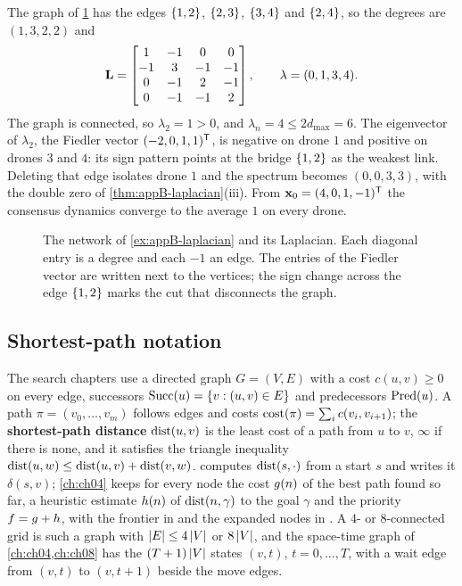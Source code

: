 \begin{example}
\label{ex:appB-laplacian}
The graph of \cref{fig:appB-laplacian} has the edges $\left\{ 1,2 \right\}$, $\left\{ 2,3 \right\}$, $\left\{ 3,4 \right\}$ and $\left\{ 2,4 \right\}$, so the degrees are $(1, 3, 2, 2)$ and
\begin{equation*}
  \mathbf{L} = \begin{bmatrix} 1 & -1 & 0 & 0\\ -1 & 3 & -1 & -1\\ 0 & -1 & 2 & -1\\ 0 & -1 & -1 & 2\end{bmatrix},
  \qquad \lambda = (0, 1, 3, 4).
\end{equation*}
The graph is connected, so $\lambda_2 = 1 > 0$, and $\lambda_n = 4 \le 2d_{\max} = 6$. The eigenvector of $\lambda_2$, the Fiedler vector $(-2, 0, 1, 1)^{\mathsf{T}}$, is negative on drone $1$ and positive on drones $3$ and $4$: its sign pattern points at the bridge $\left\{ 1,2 \right\}$ as the weakest link. Deleting that edge isolates drone $1$ and the spectrum becomes $(0, 0, 3, 3)$, with the double zero of \cref{thm:appB-laplacian}(iii). From $\mathbf{x}_0 = (4, 0, 1, -1)^{\mathsf{T}}$ the consensus dynamics converge to the average $1$ on every drone.
\end{example}

\begin{figure}[tb]
  \centering
  \caption{The network of \cref{ex:appB-laplacian} and its Laplacian. Each diagonal entry is a degree and each $-1$ an edge. The entries of the Fiedler vector are written next to the vertices; the sign change across the edge $\left\{ 1,2 \right\}$ marks the cut that disconnects the graph.}
  \label{fig:appB-laplacian}
\end{figure}

\subsection{Shortest-path notation}
\label{sec:appB-shortest-path}

The search chapters use a directed graph $G = (V, E)$ with a cost $c(u, v)
\ge 0$ on every edge, successors $\operatorname{Succ}(u) = \left\{ v : (u, v) \in E \right\}$ and
predecessors $\operatorname{Pred}(u)$. A path $\pi = (v_0, \dots, v_m)$ follows edges and
costs $\operatorname{cost}(\pi) = \sum_i c(v_i, v_{i+1})$; the \textbf{shortest-path
distance} $\operatorname{dist}(u, v)$ is the least cost of a
path from $u$ to $v$, $\infty$ if there is none, and it satisfies the triangle
inequality $\operatorname{dist}(u, w) \le \operatorname{dist}(u, v) + \operatorname{dist}(v, w)$. 
computes $\operatorname{dist}(s, \cdot)$ from a start $s$ and writes it $\delta(s, v)$;
\cref{ch:ch04} keeps for every node the cost $g(n)$ of the best path
found so far, a heuristic estimate $h(n)$ of $\operatorname{dist}(n, \gamma)$ to the
goal $\gamma$ and the priority $f = g + h$, with the frontier in
\Open and the expanded nodes in \Closed. A 4- or 8-connected grid is such a
graph with $\left\lvert E \right\rvert \le 4\left\lvert V \right\rvert$ or $8\left\lvert V \right\rvert$, and the space-time graph of
\cref{ch:ch04,ch:ch08} has the $(T+1)\left\lvert V \right\rvert$ states $(v, t)$, $t = 0, \dots,
T$, with a wait edge from $(v, t)$ to $(v, t+1)$ beside the move edges.

